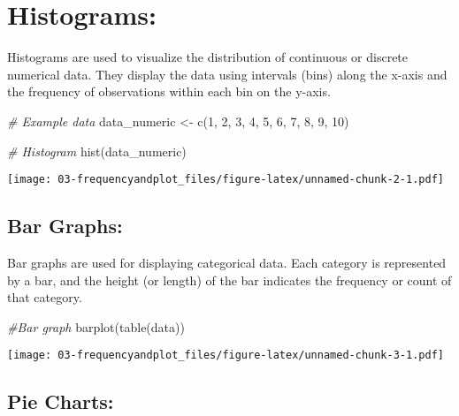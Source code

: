 \documentclass[
]{book}
\newenvironment{Shaded}{\begin{snugshade}}{\end{snugshade}}
\newcommand{\CommentTok}[1]{\textcolor[rgb]{0.56,0.35,0.01}{\textit{#1}}}
\newcommand{\DecValTok}[1]{\textcolor[rgb]{0.00,0.00,0.81}{#1}}
\newcommand{\FunctionTok}[1]{\textcolor[rgb]{0.00,0.00,0.00}{#1}}
\newcommand{\NormalTok}[1]{#1}
\newcommand{\OtherTok}[1]{\textcolor[rgb]{0.56,0.35,0.01}{#1}}
\begin{document}
\hypertarget{histograms}{%
\chapter{Histograms:}\label{histograms}}

Histograms are used to visualize the distribution of continuous or discrete numerical data. They display the data using intervals (bins) along the x-axis and the frequency of observations within each bin on the y-axis.

\begin{Shaded}
\begin{Highlighting}[]
\CommentTok{\# Example data}
\NormalTok{data\_numeric }\OtherTok{\textless{}{-}} \FunctionTok{c}\NormalTok{(}\DecValTok{1}\NormalTok{, }\DecValTok{2}\NormalTok{, }\DecValTok{3}\NormalTok{, }\DecValTok{4}\NormalTok{, }\DecValTok{5}\NormalTok{, }\DecValTok{6}\NormalTok{, }\DecValTok{7}\NormalTok{, }\DecValTok{8}\NormalTok{, }\DecValTok{9}\NormalTok{, }\DecValTok{10}\NormalTok{)}

\CommentTok{\# Histogram}
\FunctionTok{hist}\NormalTok{(data\_numeric)}
\end{Highlighting}
\end{Shaded}

\texttt{[image: 03-frequencyandplot\_files/figure-latex/unnamed-chunk-2-1.pdf]}

\hypertarget{bar-graphs}{%
\section{Bar Graphs:}\label{bar-graphs}}

Bar graphs are used for displaying categorical data. Each category is represented by a bar, and the height (or length) of the bar indicates the frequency or count of that category.

\begin{Shaded}
\begin{Highlighting}[]
\CommentTok{\#Bar graph}
\FunctionTok{barplot}\NormalTok{(}\FunctionTok{table}\NormalTok{(data))}
\end{Highlighting}
\end{Shaded}

\texttt{[image: 03-frequencyandplot\_files/figure-latex/unnamed-chunk-3-1.pdf]}

\hypertarget{pie-charts}{%
\section{Pie Charts:}\label{pie-charts}}
\end{document}
